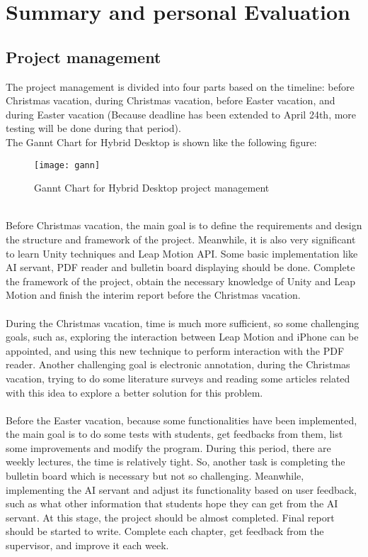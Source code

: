 
\chapter{Summary and personal Evaluation} %

\label{Chapter9} %
\section{Project management}
The project management is divided into four parts based on the timeline: before Christmas vacation, during Christmas vacation, before Easter vacation, and during Easter vacation (Because deadline has been extended to April 24th, more testing will be done during that period).
\\
The Gannt Chart for Hybrid Desktop is shown like the following figure:
\begin{figure}[h]
    \centering
	\texttt{[image: gann]}
    \caption{Gannt Chart for Hybrid Desktop project management}
    \label{fig:mesh1}
\end{figure}
\\
Before Christmas vacation, the main goal is to define the requirements and design the structure and framework of the project. Meanwhile, it is also very significant to learn Unity techniques and Leap Motion API. Some basic implementation like AI servant, PDF reader and bulletin board displaying should be done. Complete the framework of the project, obtain the necessary knowledge of Unity and Leap Motion and finish the interim report before the Christmas vacation. 
\\
\\
During the Christmas vacation, time is much more sufficient, so some challenging goals, such as, exploring the interaction between Leap Motion and iPhone can be appointed, and using this new technique to perform interaction with the PDF reader. Another challenging goal is electronic annotation, during the Christmas vacation, trying to do some literature surveys and reading some articles related with this idea to explore a better solution for this problem.
\\
\\
Before the Easter vacation, because some functionalities have been implemented, the main goal is to do some tests with students, get feedbacks from them, list some improvements and modify the program. During this period, there are weekly lectures, the time is relatively tight. So, another task is completing the bulletin board which is necessary but not so challenging. Meanwhile, implementing the AI servant and adjust its functionality based on user feedback, such as what other information that students hope they can get from the AI servant. At this stage, the project should be almost completed. Final report should be started to write. Complete each chapter, get feedback from the supervisor, and improve it each week.

